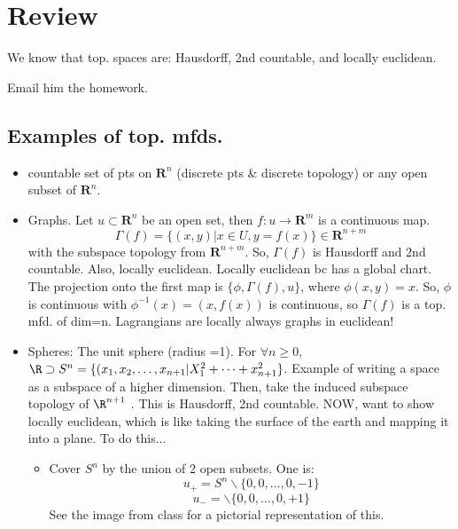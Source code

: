 \documentclass[12pt,letterpaper]{article}
\begin{document}
\section*{Review}
We know that top. spaces are: Hausdorff, 2nd countable, and locally euclidean.

Email him the homework. 

\subsection{Examples of top. mfds.}
\begin{itemize}
    \item countable set of pts on $\mathbf{R}^n$ (discrete pts & discrete topology) or any open subset of $\mathbf{R}^n$.
    \item Graphs. Let $ u\subset \mathbf{R}^n$ be an open set, then $f: u \rightarrow \mathbf{R}^m$ is a continuous map.
    \begin{equation}
        \Gamma(f) = \{ (x,y) | x \in U, y = f(x) \} \in \mathbf{R}^{n+m}
    \end{equation}
    with the subspace topology from $\mathbf{R}^{n+m}$. So, $\Gamma(f) $ is Hausdorff and 2nd countable. Also, locally euclidean. Locally euclidean bc has a global chart. The projection onto the first map is $\{ \phi, \Gamma(f), u \}$, where $\phi(x,y) = x$. So, $\phi$ is continuous with $\phi^{-1}(x) = (x, f(x))$ is continuous, so $\Gamma(f)$ is a top. mfd. of dim=n. Lagrangians are locally always graphs in euclidean!
    \item Spheres: The unit sphere (radius =1). For $\forall n \geq 0$, $\R \supset S^n = \{ (x_1, x_2, \dots , x_{n+1} | X_1^2 + \dots + x_{n+1}^2 \}$. Example of writing a space as a subspace of a higher dimension. Then, take the induced subspace topology of $\R^{n+1}$ . This is Hausdorff, 2nd countable. NOW, want to show locally euclidean, which is like taking the surface of the earth and mapping it into a plane. To do this...
    \begin{itemize}
        \item Cover $S^n$ by the union of 2 open subsets. One is:
        \begin{equation}
            u_+ = S^n \backslash \{ 0,0, \dots, 0, -1\}
        \end{equation}
        \begin{equation}
            u_- = \backslash \{ 0,0, \dots, 0, +1\}
        \end{equation}
        See the image from class for a pictorial representation of this. 

\end{itemize}
\end{itemize}
\end{document}
